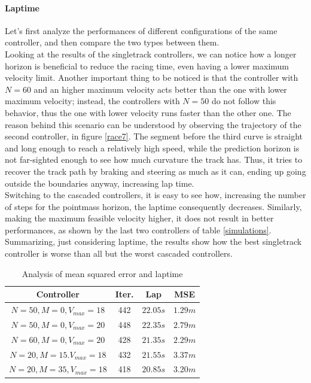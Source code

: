 \documentclass[a4paper, onecolumn, 11pt]{article}
\begin{document}
\paragraph{Laptime} \label{laptime}
Let's first analyze the performances of different configurations of the same 
controller, and then compare the two types between them. \\
Looking at the results of the singletrack controllers, we can notice how a
longer horizon is beneficial to reduce the racing time, even having a lower
maximum velocity limit. Another important thing to be noticed is that the
controller with $N=60$ and an higher maximum velocity acts better than the one
with lower maximum velocity; instead, the controllers with $N=50$ do not follow
this behavior, thus the one with lower velocity runs faster than the other one.
The reason behind this scenario can be understood by observing the trajectory of
the second controller, in figure \ref{race7}. The segment before the third curve
is straight and long enough to reach a relatively high speed, while the
prediction horizon is not far-sighted enough to see how much curvature the track
has. Thus, it tries to recover the track path by braking and steering as much as
it can, ending up going outside the boundaries anyway, increasing lap time. \\
Switching to the cascaded controllers, it is easy to see how, increasing the number
of steps for the pointmass horizon, the laptime consequently decreases. Similarly, 
making the maximum feasible velocity higher, it does not result in better performances, 
as shown by the last two controllers of table \ref{simulations}. \\
Summarizing, just considering laptime, the results show how the best singletrack
controller is worse than all but the worst cascaded controllers.
\begin{table}[H]
    \centering
    \caption{Analysis of mean squared error and laptime}
    \begin{tabular}{|c||c|c|c|}
        \hline
        \textbf{Controller} & \textbf{Iter.} & \textbf{Lap} & \textbf{MSE} \\ [0.5ex] 
        \hline
        \hline
        $N=50, M=0, V_{max}=18$ & 442 & $22.05 s$ & $1.29 m$ \\
        \hline
        $N=50, M=0, V_{max}=20$ & 448 & $22.35 s$ & $2.79 m$ \\
        \hline
        $N=60, M=0, V_{max}=20$ & 428 & $21.35 s$ & $2.29 m$ \\
        \hline
        $N=20, M=15. V_{max}=18$ & 432 & $21.55 s$ & $3.37 m$ \\
        \hline
        $N=20, M=35, V_{max}=18$ & 418 & $20.85 s$ & $3.20 m$ \\
        \hline
    \end{tabular}
\end{table}
\end{document}
